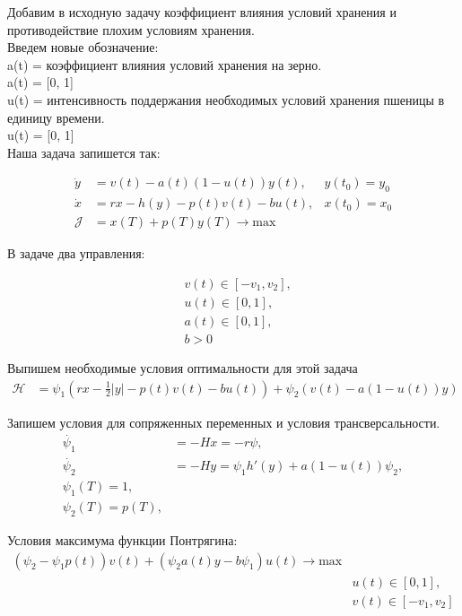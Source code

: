 Добавим в исходную задачу коэффициент влияния условий хранения и противодействие плохим условиям хранения.\\

Введем новые обозначение:\\
{a(t)} = коэффициент влияния условий хранения на зерно.\\
a(t) = [0, 1]\\
{u(t)} = интенсивность поддержания необходимых условий хранения пшеницы в единицу времени.\\
u(t) = [0, 1]\\

Наша задача запишется так:

\begin{align}
    \Dot{y} & = v(t) - a(t)(1 - u(t)) y(t), & y(t_{0}) = y_{0} \\
    \Dot{x} & = r x - h(y) - p(t) v(t) - b u(t), & x(t_{0}) = x_{0} \\
    \mathcal{J} & = x(T) + p(T) y(T) \to \mathrm{max}
\end{align}

В задаче два управления:

\begin{align}
    & v(t) \in [-v_{1}, v_{2}], \\
    & u(t) \in [0, 1], \\
    & a(t) \in [0, 1],\\
    & b > 0
\end{align}

Выпишем необходимые условия оптимальности для этой задача\\
\begin{align}
    \mathcal{H} & = \psi_{1} (r x- \frac{1}{2}|y| - p(t) v(t) - b u(t)) + \psi_{2} (v(t) - a(1-u(t))y)
\end{align} 

Запишем условия для сопряженных переменных и условия трансверсальности.
\begin{align}
    \Dot{\psi_{1}} & = -H x = -r \psi,\\
    \Dot{\psi_{2}} & = -H y = \psi_{1} h'(y) + a(1-u(t))\psi_{2},\\
    {\psi_{1}(T)} = 1,\\
    {\psi_{2}(T)} = p(T),
\end{align} 

Условия максимума функции Понтрягина:\\
\begin{align}
     (\psi_{2} - \psi_{1} p(t)) v(t) + (\psi_{2} a(t) y - b \psi_{1})u(t)  \to \mathrm{max}\\
     & u(t) \in [0, 1],\\
     & v(t) \in [-v_{1}, v_{2}]
\end{align}



